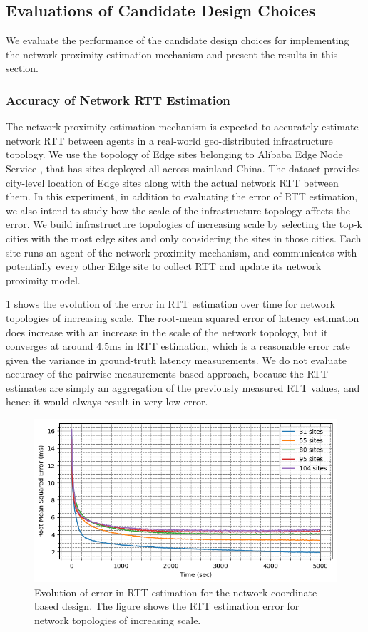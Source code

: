 \subsection{Evaluations of Candidate Design Choices} 
We evaluate the performance of the candidate design choices for implementing the network proximity estimation mechanism and present the results in this section.

\subsubsection{Accuracy of Network RTT Estimation}
\label{sec:nw_rtt_error}
The network proximity estimation mechanism is expected to accurately estimate network RTT between agents in a real-world geo-distributed infrastructure topology. We use the topology of Edge sites belonging to Alibaba Edge Node Service \cite{xu2021cloud}, that has sites deployed all across mainland China. The dataset provides city-level location of Edge sites along with the actual network RTT between them. In this experiment, in addition to evaluating the error of RTT estimation, we also intend to study how the scale of the infrastructure topology affects the error. We build infrastructure topologies of increasing scale by selecting the top-k cities with the most edge sites and only considering the sites in those cities. Each site runs an agent of the network proximity mechanism, and communicates with potentially every other Edge site to collect RTT and update its network proximity model.
\par \cref{fig:nw_coord_error} shows the evolution of the error in RTT estimation over time for network topologies of increasing scale. The root-mean squared error of latency estimation does increase with an increase in the scale of the network topology, but it converges at around 4.5ms in RTT estimation, which is a reasonable error rate given the variance in ground-truth latency measurements. We do not evaluate accuracy of the pairwise measurements based approach, because the RTT estimates are simply an aggregation of the previously measured RTT values, and hence it would always result in very low error. \begin{figure}
\centering
\includegraphics[width=0.75\linewidth]{figures/design_space/nw_prox/error.png}
\caption{Evolution of error in RTT estimation for the network coordinate-based design. The figure shows the RTT estimation error for network topologies of increasing scale.}
\label{fig:nw_coord_error}
\end{figure}


